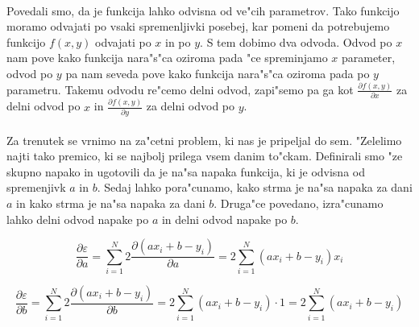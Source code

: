 \paragraph{}
Povedali smo, da je funkcija lahko odvisna od ve"cih parametrov. Tako funkcijo moramo odvajati po vsaki spremenljivki posebej, kar pomeni da potrebujemo funkcijo $f(x,y)$ odvajati po $x$ in po $y$. S tem dobimo dva odvoda. Odvod po $x$ nam pove kako funkcija nara"s"ca oziroma pada "ce spreminjamo $x$ parameter, odvod po $y$ pa nam seveda pove kako funkcija nara"s"ca oziroma pada po $y$ parametru. Takemu odvodu re"cemo delni odvod, zapi"semo pa ga kot $\frac{\partial f(x,y)}{\partial x}$ za delni odvod po $x$ in $\frac{\partial f(x,y)}{\partial y}$ za delni odvod po $y$.

\paragraph{}
Za trenutek se vrnimo na za"cetni problem, ki nas je pripeljal do sem. "Zelelimo najti tako premico, ki se najbolj prilega vsem danim to"ckam. Definirali smo "ze skupno napako in ugotovili da je na"sa napaka funkcija, ki je odvisna od spremenjivk $a$ in $b$. Sedaj lahko pora"cunamo, kako strma je na"sa napaka za dani $a$ in kako strma je na"sa napaka za dani $b$. Druga"ce povedano, izra"cunamo lahko delni odvod napake po $a$ in delni odvod napake po $b$.

$$\frac{\partial \varepsilon}{\partial a} =
\sum_{i=1}^{N} 2 \frac{\partial (a x_i + b - y_i)}{\partial a} =
2 \sum_{i=1}^{N} (a x_i + b - y_i)x_i$$

$$\frac{\partial \varepsilon}{\partial b} =
\sum_{i=1}^{N} 2 \frac{\partial (a x_i + b - y_i)}{\partial b} =
2 \sum_{i=1}^{N} (a x_i + b - y_i)\cdot1 = 2 \sum_{i=1}^{N} (a x_i + b - y_i)$$